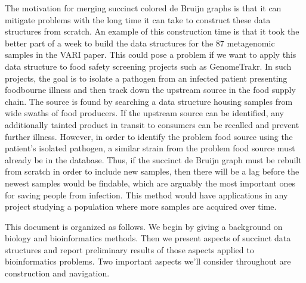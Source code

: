 \documentclass[doctor]{thesis}
\begin{document}




The motivation for merging succinct colored de Bruijn graphs is that it can mitigate problems with the long time it can take to construct these data structures from scratch.  An example of this construction time is that it took the better part of a week to build the data structures for the 87 metagenomic samples in the VARI paper.  This could pose a problem if we want to apply this data structure to food safety screening projects such as GenomeTrakr.  In such projects, the goal is to isolate a pathogen from an infected patient presenting foodbourne illness and then track down the upstream source in the food supply chain.  The source is found by searching a data structure housing samples from wide swaths of food producers.  If the upstream source can be identified, any additionally tainted product in transit to consumers can be recalled and prevent further illness.  However, in order to identify the problem food source using the patient's isolated pathogen, a similar strain from the problem food source must already be in the database.  Thus, if the succinct de Bruijn graph must be rebuilt from scratch in order to include new samples, then there will be a lag before the newest samples would be findable, which are arguably the most important ones for saving people from infection.  This method would have applications in any project studying a population where more samples are acquired over time.

This document is organized as follows.  We begin by giving a background on biology and bioinformatics methods.  Then we present aspects of succinct data structures and report preliminary results of those aspects applied to bioinformatics problems.  Two important aspects we'll consider throughout are construction and navigation. 
\end{document}
